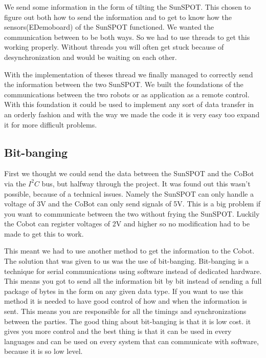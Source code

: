 \documentclass[a4paper,12pt]{article}
\begin{document}
We send some information in the form of tilting the SunSPOT. This chosen to
figure out both how to send the information and to get to know how the
sensors(EDemoboard) of the SunSPOT functioned. We wanted the communication
between to be both ways. So we had to use threads to get this working properly.
Without threads you will often get stuck because of desynchronization and would
be waiting on each other.

With the implementation of theses thread we finally managed to correctly send
the information between the two SunSPOT. We built the foundations of the
communications between the two robots or as application as a remote control.
With this foundation it could be used to implement any sort of data transfer in
an orderly fashion and with the way we made the code it is very easy too expand
it for more difficult problems.

\subsection{Bit-banging}
\label{subsec:bitbang}


First we thought we could send the data between the SunSPOT and the CoBot via
the $I^2C$ bus, but halfway through the project. It was found out this wasn't
possible, because of a technical issues. Namely the SunSPOT can only handle a
voltage of 3V and the CoBot can only send signals of 5V. This is a big problem
if you want to communicate between the two without frying the SunSPOT. Luckily
the Cobot can register voltages of 2V and higher so no modification had to be
made to get this to work.

This meant we had to use another method to get the information to the Cobot. The
solution that was given to us was the use of bit-banging. Bit-banging is a
technique for serial communications using software instead of dedicated
hardware. This means you got to send all the information bit by bit instead of
sending a full package of bytes in the form on any given data type. If you want
to use this method it is needed to have good control of how and when the
information is sent. This means you are responsible for all the timings and
synchronizations between the parties. The good thing about bit-banging is that
it is low cost. it gives you more control and the best thing is that it can be
used in every languages and can be used on every system that can communicate
with software, because it is so low level.
\end{document}

